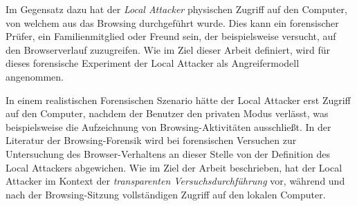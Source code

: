 Im Gegensatz dazu hat der \textit{Local Attacker} physischen Zugriff auf den Computer, von welchem aus das Browsing durchgeführt wurde. Dies kann ein forensischer Prüfer, ein Familienmitglied oder Freund sein, der  beispielsweise versucht, auf den Browserverlauf zuzugreifen. 
Wie im Ziel dieser Arbeit definiert, wird für dieses forensische Experiment der Local Attacker als Angreifermodell angenommen. \cite{Aggarwal.2010}

In einem realistischen Forensischen Szenario hätte der Local Attacker erst Zugriff auf den Computer, nachdem der Benutzer den privaten Modus verlässt, was beispielsweise die Aufzeichnung von Browsing-Aktivitäten ausschließt. \cite{Aggarwal.2010}
In der Literatur der Browsing-Forensik wird bei forensischen Versuchen zur Untersuchung des Browser-Verhaltens an dieser Stelle von der Definition des Local Attackers abgewichen. 
Wie im Ziel der Arbeit beschrieben, hat der Local Attacker im Kontext der \textit{transparenten Versuchsdurchführung} vor, während und nach der Browsing-Sitzung vollständigen Zugriff auf den lokalen Computer. \cite{Fayyad.2021, Rochmadi.2017}




